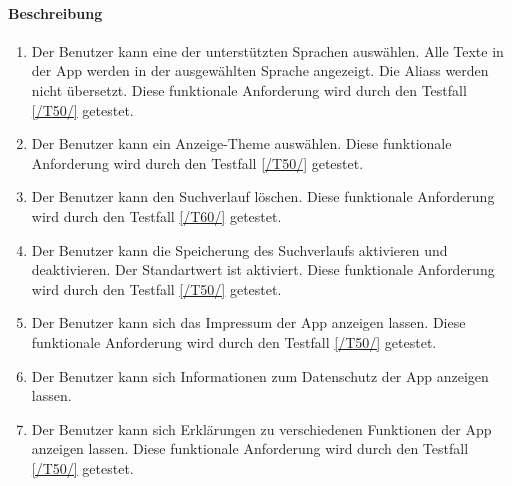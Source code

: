 \paragraph{Beschreibung}
\begin{enumerate}[start=51, label=\textbf{/FA\arabic*/}, align=left]
    \item \label{/FA51/} Der \Gls{Benutzer} kann eine der unterstützten Sprachen auswählen. Alle Texte in der App werden in der ausgewählten Sprache angezeigt. Die \Glspl{Alias} werden nicht übersetzt. Diese funktionale Anforderung wird durch den Testfall \ref{/T50/} getestet.
    \item \label{/FA52/} Der \Gls{Benutzer} kann ein Anzeige-\Gls{Theme} auswählen. Diese funktionale Anforderung wird durch den Testfall \ref{/T50/} getestet.
    \item \label{/FA53/} Der \Gls{Benutzer} kann den \Gls{Suchverlauf} löschen. Diese funktionale Anforderung wird durch den Testfall \ref{/T60/} getestet.
    \item \label{/FA54/} Der \Gls{Benutzer} kann die Speicherung des \Gls{Suchverlauf}s aktivieren und deaktivieren. Der Standartwert ist \dq aktiviert\dq{}. Diese funktionale Anforderung wird durch den Testfall \ref{/T50/} getestet.
    \item \label{/FA55/} Der \Gls{Benutzer} kann sich das Impressum der App anzeigen lassen. Diese funktionale Anforderung wird durch den Testfall \ref{/T50/} getestet.
    \item \label{/FA56/} Der \Gls{Benutzer} kann sich Informationen zum Datenschutz der App anzeigen lassen.
    \item \label{/FA57/} Der \Gls{Benutzer} kann sich Erklärungen zu verschiedenen Funktionen der App anzeigen lassen. Diese funktionale Anforderung wird durch den Testfall \ref{/T50/} getestet.
\end{enumerate}